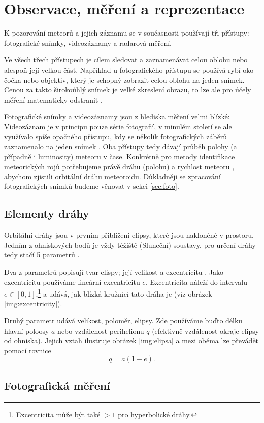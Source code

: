 \chapter{Observace, měření a reprezentace}
K pozorování meteorů a jejich záznamu se v současnosti používají tři přístupy: fotografické snímky, videozáznamy a radarová měření.

Ve všech třech přístupech je cílem sledovat a zaznamenávat celou oblohu nebo alespoň její velkou část. Například u fotografického přístupu se používá rybí oko \cite{ceplecha} -- čočka nebo objektiv, který je schopný zobrazit celou oblohu na jeden snímek. Cenou za takto širokoúhlý snímek je velké zkreslení obrazu, to lze ale pro účely měření matematicky odstranit \cite{ceplecha}.


Fotografické snímky a videozáznamy jsou z hlediska měření velmi blízké: Videozáznam je v principu pouze série fotografií, v minulém století se ale využívalo spíše opačného přístupu, kdy se několik fotografických záběrů zaznamenalo na jeden snímek \cite{ceplecha}. Oba přístupy tedy dávají průběh polohy (a případně i luminosity) meteoru v čase. Konkrétně pro metody identifikace meteorických rojů potřebujeme právě dráhu (polohu) a rychlost meteoru \cite{ceplecha}, abychom zjistili orbitální dráhu meteoroidu. Důkladněji se zpracování fotografických snímků budeme věnovat v sekci \ref{sec:foto}.

\section{Elementy dráhy}
Orbitální dráhy jsou v prvním přiblížení elipsy, které jsou nakloněné v prostoru. Jedním z ohniskových bodů je vždy těžiště (Sluneční) soustavy, pro určení dráhy tedy stačí 5 parametrů \cite{newapproach}.

Dva z parametrů popisují tvar elispy; její velikost a excentricitu \cite{newapproach}. Jako excentricitu používáme lineární excentricitu $e$. Excentricita náleží do intervalu $e\in\left[0,1\right]$,\footnote{Excentricita může být také $>1$ pro hyperbolické dráhy. } a udává, jak blízká kružnici tato dráha je (viz obrázek \ref{img:excentricity}).


Druhý parametr udává velikost, poloměr, elipsy. Zde používáme buďto délku hlavní poloosy $a$ nebo vzdálenost perihelionu $q$ (efektivně vzdálenost okraje elipsy od ohniska). Jejich vztah ilustruje obrázek \ref{img:elipsa} a mezi oběma lze převádět pomocí rovnice \cite{ceplecha}
$$
    q=a(1-e)\text{.}
$$


\section{Fotografická měření\label{sec:foto}}
\note{}
